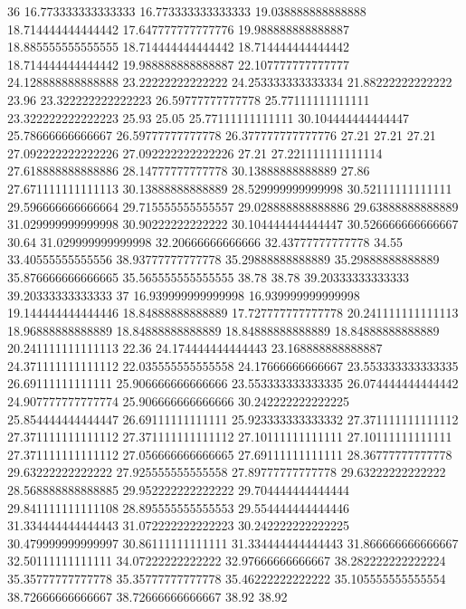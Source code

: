 36 16.773333333333333 16.773333333333333 19.038888888888888 18.714444444444442 17.647777777777776 19.988888888888887 18.885555555555555 18.714444444444442 18.714444444444442 18.714444444444442 19.988888888888887 22.107777777777777 24.128888888888888 23.22222222222222 24.253333333333334 21.88222222222222 23.96 23.322222222222223 26.59777777777778 25.77111111111111 23.322222222222223 25.93 25.05 25.77111111111111 30.104444444444447 25.78666666666667 26.59777777777778 26.377777777777776 27.21 27.21 27.21 27.092222222222226 27.092222222222226 27.21 27.221111111111114 27.618888888888886 28.14777777777778 30.13888888888889 27.86 27.671111111111113 30.13888888888889 28.529999999999998 30.52111111111111 29.596666666666664 29.715555555555557 29.028888888888886 29.63888888888889 31.029999999999998 30.90222222222222 30.104444444444447 30.526666666666667 30.64 31.029999999999998 32.20666666666666 32.43777777777778 34.55 33.40555555555556 38.93777777777778 35.29888888888889 35.29888888888889 35.876666666666665 35.565555555555555 38.78 38.78 39.20333333333333 39.20333333333333
37 16.939999999999998 16.939999999999998 19.144444444444446 18.84888888888889 17.727777777777778 20.241111111111113 18.96888888888889 18.84888888888889 18.84888888888889 18.84888888888889 20.241111111111113 22.36 24.174444444444443 23.168888888888887 24.371111111111112 22.035555555555558 24.17666666666667 23.553333333333335 26.69111111111111 25.906666666666666 23.553333333333335 26.074444444444442 24.907777777777774 25.906666666666666 30.242222222222225 25.854444444444447 26.69111111111111 25.923333333333332 27.371111111111112 27.371111111111112 27.371111111111112 27.10111111111111 27.10111111111111 27.371111111111112 27.056666666666665 27.69111111111111 28.36777777777778 29.63222222222222 27.925555555555558 27.89777777777778 29.63222222222222 28.568888888888885 29.952222222222222 29.704444444444444 29.841111111111108 28.895555555555553 29.554444444444446 31.334444444444443 31.072222222222223 30.242222222222225 30.479999999999997 30.86111111111111 31.334444444444443 31.866666666666667 32.50111111111111 34.07222222222222 32.97666666666667 38.282222222222224 35.35777777777778 35.35777777777778 35.46222222222222 35.105555555555554 38.72666666666667 38.72666666666667 38.92 38.92
